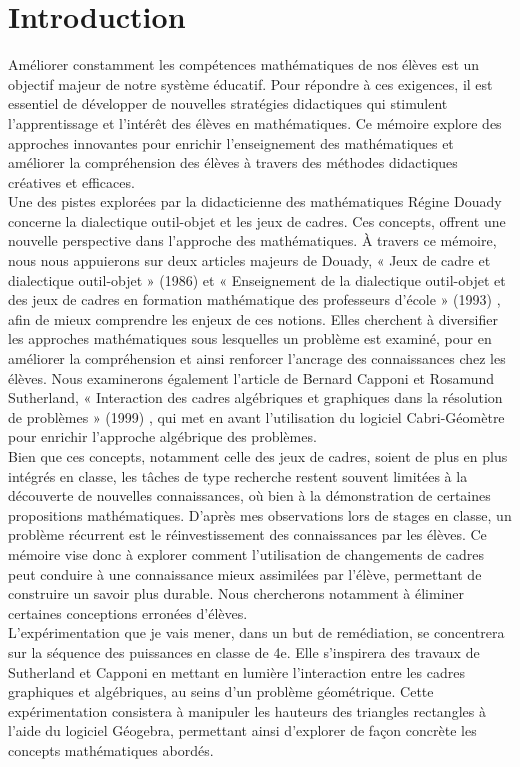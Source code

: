 \section*{Introduction}

Améliorer constamment les compétences mathématiques de nos élèves est un objectif majeur de notre système éducatif.
Pour répondre à ces exigences,
il est essentiel de développer de nouvelles stratégies didactiques qui stimulent l'apprentissage et l'intérêt des élèves en mathématiques.
Ce mémoire explore des approches innovantes pour enrichir l'enseignement des mathématiques et améliorer la compréhension des élèves à travers des méthodes didactiques créatives et efficaces.\\

Une des pistes explorées par la didacticienne des mathématiques Régine Douady concerne la dialectique outil-objet et les jeux de cadres.
Ces concepts,
offrent une nouvelle perspective dans l'approche des mathématiques.
À travers ce mémoire, nous nous appuierons sur deux articles majeurs de Douady,
« Jeux de cadre et dialectique outil-objet » (1986) \cite{douady1} et « Enseignement de la dialectique outil-objet et des jeux de cadres en formation mathématique des professeurs d'école » (1993) \cite{douady2},
afin de mieux comprendre les enjeux de ces notions.
Elles cherchent à diversifier les approches mathématiques sous lesquelles un problème est examiné,
pour en améliorer la compréhension et ainsi renforcer l'ancrage des connaissances chez les élèves.
Nous examinerons également l'article de Bernard Capponi et Rosamund Sutherland,
« Interaction des cadres algébriques et graphiques dans la résolution de problèmes » (1999) \cite{capponi},
qui met en avant l'utilisation du logiciel Cabri-Géomètre pour enrichir l'approche algébrique des problèmes.\\

Bien que ces concepts, notamment celle des jeux de cadres, soient de plus en plus intégrés en classe,
les tâches de type recherche restent souvent limitées à la découverte de nouvelles connaissances,
où bien à la démonstration de certaines propositions mathématiques.
D'après mes observations lors de stages en classe,
un problème récurrent est le réinvestissement des connaissances par les élèves.
Ce mémoire vise donc à explorer comment l'utilisation de changements de cadres peut conduire à une connaissance mieux assimilées par l'élève,
permettant de construire un savoir plus durable.
Nous chercherons notamment à éliminer certaines conceptions erronées d'élèves.\\

L'expérimentation que je vais mener,
dans un but de remédiation,
se concentrera sur la séquence des puissances en classe de 4e.
Elle s'inspirera des travaux de Sutherland et Capponi en mettant en lumière l'interaction entre les cadres graphiques et algébriques,
au seins d'un problème géométrique.
Cette expérimentation consistera à manipuler les hauteurs des triangles rectangles à l'aide du logiciel Géogebra,
permettant ainsi d'explorer de façon concrète les concepts mathématiques abordés.